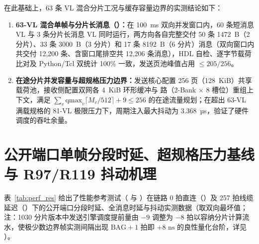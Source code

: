 在此基础上，63 条 VL 混合分片工况与缓存容量边界的实测结论如下：
\begin{enumerate}
  \item \textbf{63-VL 混合单帧与分片长消息（）：}在 100~ms 双向并发窗口内，60 条短消息 VL 与 3 条分片长消息 VL 同时运行，两方向各自完整交付 50 条 1472~B（2 分片）、33 条 3000~B（3 分片）和 17 条 8192~B（6 分片）消息（双向窗口内共交付 12,200 条、含窗口尾排空共 12,206 条消息），HDL 自检、逐字节载荷比对及 Python/Tcl 双统计 100\% 一致，发送页池峰值占用 $\le 205 / 256$。
  \item \textbf{在途分片并发容量与超规格压力边界：}发送核心配置 256 页（128~KiB）共享载荷池，接收侧配置双网各 4~KiB 环形缓冲与 \ReasmContexts{} 路（2-Bank $\times$ 8 槽位）重组上下文，满足 $\sum_v \text{qmax}_v \lceil M_v/512\rceil + 9 \le 256$ 的在途流量规划；在超出 63-VL 满载规格的 81-VL 极限压力下，周期注入最大抖动为 3.368~µs，验证了硬件调度的吞吐余量。
\end{enumerate}

\section{公开端口单帧分段时延、超规格压力基线与 R97/R119 抖动机理}\label{sec:p-res}

表~\ref{tab:perf_res} 给出了性能参考测试（ 与 ）在链路 0 拍直连（）及 257 拍线缆延迟（）下的公开端口分段时延、全消息时延与抖动实测数据（取双向最坏值；注：1030 分片版本中发送引擎调度提前量由 $-9$ 调整为 $-8$ 拍以容纳分片计算流水，使极少数边界帧实测间隔出现 $\text{BAG}+1$ 拍即 $+8\text{ ns}$ 的良性量化台阶，详见 ）。

